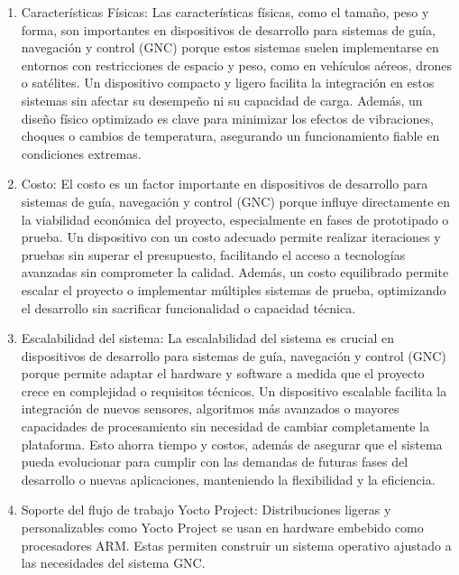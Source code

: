 \begin{enumerate}
    \item Características Físicas: Las características físicas, como el tamaño, peso y forma, son importantes en dispositivos de desarrollo para sistemas de guía, navegación y control (GNC) porque estos sistemas suelen implementarse en entornos con restricciones de espacio y peso, como en vehículos aéreos, drones o satélites. Un dispositivo compacto y ligero facilita la integración en estos sistemas sin afectar su desempeño ni su capacidad de carga. Además, un diseño físico optimizado es clave para minimizar los efectos de vibraciones, choques o cambios de temperatura, asegurando un funcionamiento fiable en condiciones extremas.

    \item Costo: El costo es un factor importante en dispositivos de desarrollo para sistemas de guía, navegación y control (GNC) porque influye directamente en la viabilidad económica del proyecto, especialmente en fases de prototipado o prueba. Un dispositivo con un costo adecuado permite realizar iteraciones y pruebas sin superar el presupuesto, facilitando el acceso a tecnologías avanzadas sin comprometer la calidad. Además, un costo equilibrado permite escalar el proyecto o implementar múltiples sistemas de prueba, optimizando el desarrollo sin sacrificar funcionalidad o capacidad técnica.

    \item Escalabilidad del sistema: 
    La escalabilidad del sistema es crucial en dispositivos de desarrollo para sistemas de guía, navegación y control (GNC) porque permite adaptar el hardware y software a medida que el proyecto crece en complejidad o requisitos técnicos. Un dispositivo escalable facilita la integración de nuevos sensores, algoritmos más avanzados o mayores capacidades de procesamiento sin necesidad de cambiar completamente la plataforma. Esto ahorra tiempo y costos, además de asegurar que el sistema pueda evolucionar para cumplir con las demandas de futuras fases del desarrollo o nuevas aplicaciones, manteniendo la flexibilidad y la eficiencia.

    \item Soporte del flujo de trabajo Yocto Project: 
    Distribuciones ligeras y personalizables como Yocto Project se usan en hardware embebido como procesadores ARM. Estas permiten construir un sistema operativo ajustado a las necesidades del sistema GNC.

\end{enumerate}
\newpage

